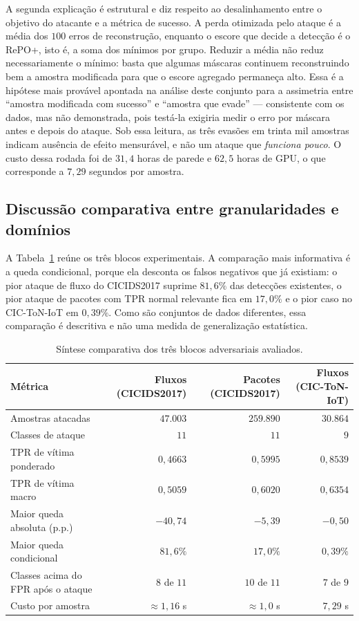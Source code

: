 \documentclass[conference]{IEEEtran}
\begin{document}
A segunda explicação é estrutural e diz respeito ao desalinhamento entre o objetivo do atacante e a métrica de sucesso.
A perda otimizada pelo ataque é a média dos $100$ erros de reconstrução, enquanto o escore que decide a detecção é o RePO+, isto é, a soma dos mínimos por grupo.
Reduzir a média não reduz necessariamente o mínimo: basta que algumas máscaras continuem reconstruindo bem a amostra modificada para que o escore agregado permaneça alto.
Essa é a hipótese mais provável apontada na análise deste conjunto para a assimetria entre “amostra modificada com sucesso” e “amostra que evade” — consistente com os dados, mas não demonstrada, pois testá-la exigiria medir o erro por máscara antes e depois do ataque.
Sob essa leitura, as três evasões em trinta mil amostras indicam ausência de efeito mensurável, e não um ataque que \emph{funciona pouco}.
O custo dessa rodada foi de $31{,}4$ horas de parede e $62{,}5$ horas de GPU, o que corresponde a $7{,}29$ segundos por amostra.

\subsection{Discussão comparativa entre granularidades e domínios}

A Tabela~\ref{tab:comparativo} reúne os três blocos experimentais.
A comparação mais informativa é a queda condicional, porque ela desconta os falsos negativos que já existiam: o pior ataque de fluxo do CICIDS2017 suprime $81{,}6\%$ das detecções existentes, o pior ataque de pacotes com TPR normal relevante fica em $17{,}0\%$ e o pior caso no CIC-ToN-IoT em $0{,}39\%$.
Como são conjuntos de dados diferentes, essa comparação é descritiva e não uma medida de generalização estatística.

\begin{table}[!t]
\centering
\footnotesize
\setlength{\tabcolsep}{8pt}
\caption{Síntese comparativa dos três blocos adversariais avaliados.}
\label{tab:comparativo}
\begin{tabular}{@{}lrrr@{}}
\toprule
\textbf{Métrica} & \textbf{Fluxos (CICIDS2017)} & \textbf{Pacotes (CICIDS2017)} & \textbf{Fluxos (CIC-ToN-IoT)} \\
\midrule
Amostras atacadas & $47.003$ & $259.890$ & $30.864$ \\
Classes de ataque & $11$ & $11$ & $9$ \\
TPR de vítima ponderado & $0{,}4663$ & $0{,}5995$ & $0{,}8539$ \\
TPR de vítima macro & $0{,}5059$ & $0{,}6020$ & $0{,}6354$ \\
Maior queda absoluta (p.p.) & $-40{,}74$ & $-5{,}39$ & $-0{,}50$ \\
Maior queda condicional & $81{,}6\%$ & $17{,}0\%$ & $0{,}39\%$ \\
Classes acima do FPR após o ataque & $8$ de $11$ & $10$ de $11$ & $7$ de $9$ \\
Custo por amostra & $\approx 1{,}16$ s & $\approx 1{,}0$ s & $7{,}29$ s \\
\bottomrule
\end{tabular}
\end{table}
\end{document}
